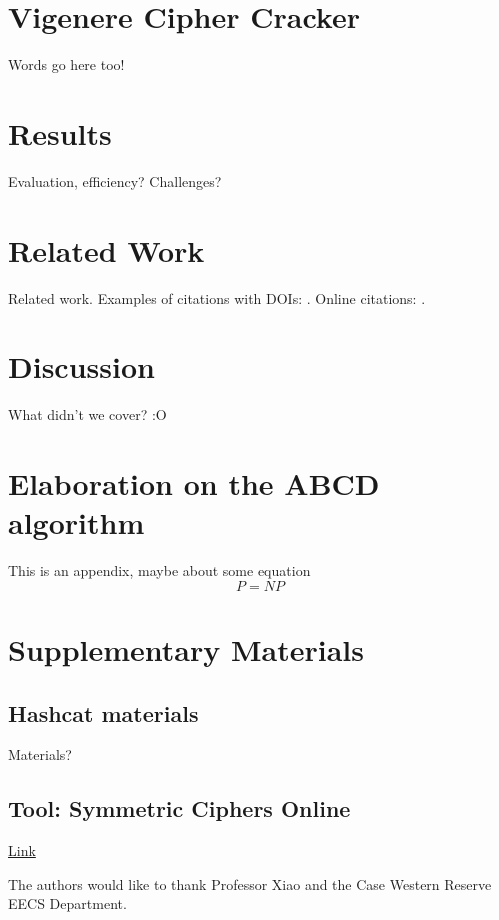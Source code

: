 \documentclass[acmlarge]{acmart}
\begin{document}
\section{Vigenere Cipher Cracker}\label{sec:vinegar}

Words go here too!

\section{Results}\label{sec:results}

Evaluation, efficiency? Challenges?

\section{Related Work}\label{sec:relatedwork}

Related work. Examples of citations with DOIs: \cite{2004:ITE:1009386.1010128, Kirschmer:2010:AEI:1958016.1958018}. Online citations: \cite{TUGInstmem, Thornburg01, CTANacmart}.

\section{Discussion}\label{sec:discussion}

What didn't we cover? :O

\appendix
\section{Elaboration on the ABCD algorithm}

This is an appendix, maybe about some equation
\begin{displaymath}
P=NP
\end{displaymath}

\section{Supplementary Materials}

\subsection{Hashcat materials}

Materials?

\subsection{Tool: Symmetric Ciphers Online }

\href{http://symmetric-ciphers.online-domain-tools.com/}{Link}

\begin{acks}

The authors would like to thank Professor Xiao and the Case Western Reserve EECS Department.

\end{acks}



\end{document}
